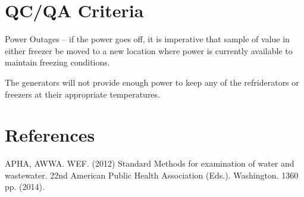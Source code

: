 \documentclass[12pt]{../SOP3_alpha}
\begin{document}

\section{QC/QA Criteria}

\NP Power Outages -- if the power goes off, it is imperative that sample of value in either freezer be moved to a new location where power is currently available to maintain freezing conditions. 

\NP The generators will not provide enough power to keep any of the refriderators or freezers at their appropriate temperatures.

\section{References}

\NP APHA, AWWA. WEF. (2012) Standard Methods for examination of water and wastewater. 22nd American Public Health Association (Eds.). Washington. 1360 pp. (2014).
\end{document}
